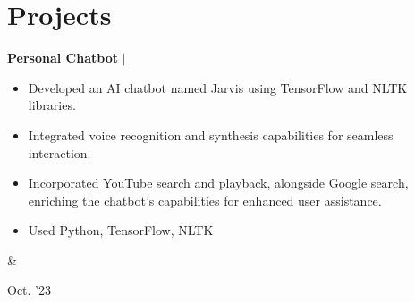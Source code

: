 \documentclass[10pt, letterpaper]{article}
\newenvironment{highlights}{
        \begin{itemize}[
                topsep=0pt,
                parsep=0.10 cm,
                partopsep=0pt,
                itemsep=0pt,
                after=\vspace{-1\baselineskip},
                leftmargin=0.4 cm + 3pt
            ]
    }{
        \end{itemize}
    } %
\let\hrefWithoutArrow\href
\renewcommand{\href}[2]{\hrefWithoutArrow{#1}{\mbox{\ifthenelse{\equal{#2}{}}{ }{#2 }\raisebox{.15ex}{\footnotesize \faExternalLink*}}}}
\let\originalTabularx\tabularx
\let\originalEndTabularx\endtabularx
\renewenvironment{tabularx}{\bgroup\centering\originalTabularx}{\originalEndTabularx\par\egroup}
\begin{document}






    
    \section{Projects}

        \begin{tabularx}{
            \textwidth-0.4 cm-0.13cm
        }{
            K{0.2 cm}
            R{4.1 cm}
        }
           \textbf{Personal Chatbot} $|$  \href{https://github.com/09hritik/jarvis}{\raisebox{-0.2\height}\faGithub\ }

            \vspace{0.10 cm}

            \begin{highlights}
                \item 
                    Developed an AI chatbot named Jarvis using TensorFlow and NLTK libraries.
                \item 
                    Integrated voice recognition and synthesis capabilities for seamless interaction.

                \item 
                    Incorporated YouTube search and playback, alongside Google search, enriching the chatbot's capabilities for enhanced user assistance.


                \item Used Python,  TensorFlow, NLTK 
            \end{highlights}
            &
            

            Oct.  '23
        \end{tabularx}
\end{document}
